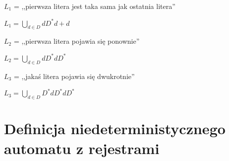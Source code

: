 \documentclass[a4paper,12pt]{report}
\begin{document}
$L_1$ = ,,pierwsza litera jest taka sama jak ostatnia litera''

$L_1 = {\bigcup \limits _{d \in D} dD^*d + d}$

$L_2$ = ,,pierwsza litera pojawia się ponownie''

$L_2 = {\bigcup \limits _{d \in D} dD^*dD^*}$

$L_3$ = ,,jakaś litera pojawia się dwukrotnie''

$L_3 = {\bigcup \limits _{d \in D} D^*dD^*dD^*}$

\section {Definicja niedeterministycznego automatu z rejestrami}
\end{document}
